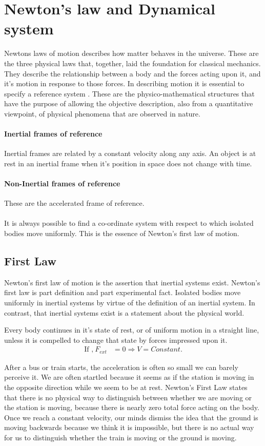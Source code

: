 \chapter{Newton's law and Dynamical system}Newtons laws of motion describes how  matter behaves in the universe. These are the  three physical laws that, together, laid the foundation for classical mechanics. They describe the relationship between a body and the forces acting upon it, and it's motion in response to those forces. In describing motion it is essential to  specify a reference system . These are the physico-mathematical structures that have the purpose of allowing the objective description, also from a quantitative viewpoint, of physical phenomena that are observed in nature.
\subsubsection{Inertial frames of reference}
Inertial frames are related by a constant velocity along any axis. An object is at rest in an inertial frame when it’s position in space does not change with time.
\subsubsection{Non-Inertial frames of reference}
These are the accelerated frame of reference.
\\\\ It is always possible to find a co-ordinate system with respect to which isolated bodies move uniformly. This is the essence of Newton's first law of motion.


\section{First Law}
Newton's first law of motion is the assertion that inertial systems exist. Newton's first law is part definition and part experimental fact. Isolated bodies move uniformly in inertial systems by virtue of the definition of an inertial system. In contrast, that inertial systems exist is a statement about the physical world.
\begin{definition}
	Every body continues in it's state of rest, or of uniform motion in a straight line, unless it is compelled to change that state by forces impressed upon it.
	\begin{align*}
	\text{If ,} \ F_{ext}&=0 \Rightarrow V= Constant.
	\end{align*}
\end{definition}
After a bus or train starts, the acceleration is often so small we can barely perceive it. We are often startled because it seems as if the station is moving in the opposite direction while we seem to be at rest. Newton's First Law states that there is no physical way to distinguish between whether we are moving or the station is moving, because there is nearly zero total force acting on the body. Once we reach a constant velocity, our minds dismiss the idea that the ground is moving backwards because we think it is impossible, but there is no actual way for us to distinguish whether the train is moving or the ground is moving.
